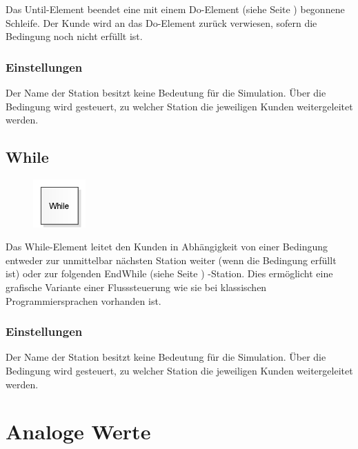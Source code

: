 Das Until-Element beendet eine mit einem
Do-Element (siehe Seite \pageref{ref:ModelElementLogicDo}) begonnene
Schleife. Der Kunde wird an das Do-Element zurück verwiesen,
sofern die Bedingung noch nicht erfüllt ist.

\subsection*{Einstellungen}

Der Name der Station besitzt keine Bedeutung für die Simulation.
Über die Bedingung wird gesteuert, zu welcher Station die jeweiligen Kunden weitergeleitet werden.


\section{While}
\label{ref:ModelElementLogicWhile}

\begin{figure}
\vspace{-22pt}
\includegraphics[width=2cm]{imageModelElementLogicWhile.png}
\vspace{-22pt}
\end{figure}

Das While-Element leitet den Kunden in Abhängigkeit von einer Bedingung entweder
zur unmittelbar nächsten Station weiter (wenn die Bedingung erfüllt ist) oder
zur folgenden EndWhile (siehe Seite \pageref{ref:ModelElementLogicEndWhile}) -Station.
Dies ermöglicht eine grafische Variante einer Flusssteuerung wie sie bei
klassischen Programmiersprachen vorhanden ist.

\subsection*{Einstellungen}

Der Name der Station besitzt keine Bedeutung für die Simulation. Über die Bedingung
wird gesteuert, zu welcher Station die jeweiligen Kunden weitergeleitet werden.





\chapter{Analoge Werte}

